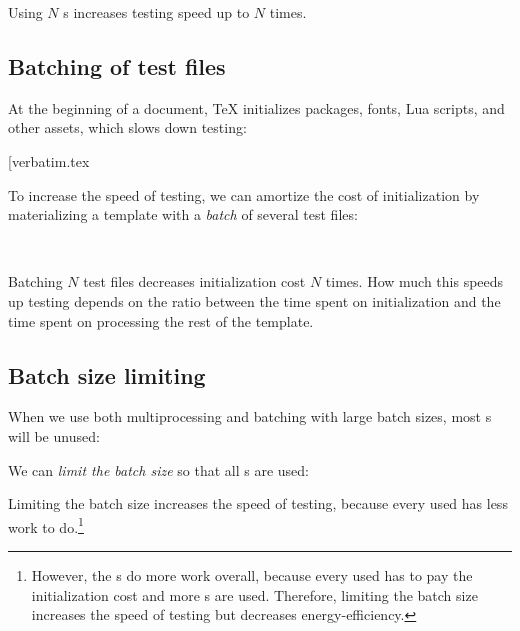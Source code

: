 \documentclass[final]{ltugboat}
\begin{document}
\smallskip
\noindent
\begingroup
\centering

\par
\endgroup

\smallskip
\noindent
Using $N$ s increases testing speed up to $N$ times.

\subsection{Batching of test files}
\label{sec:batching-of-test-files}
At the beginning of a document, \TeX{} initializes packages, fonts, Lua scripts, and other assets, which slows down testing:

\smallskip
\noindent
\example*[{verbatim.tex}

\smallskip

To increase the speed of testing, we can amortize the cost of initialization by materializing a template with a \emph{batch} of several test files:

\medskip
\noindent
{} \\

\smallskip
\noindent
Batching $N$ test files decreases initialization cost $N$ times. How much this speeds up testing depends on the ratio between the time spent on initialization and the time spent on processing the rest of the template.

\subsection{Batch size limiting}

When we use both multiprocessing and batching with large batch sizes, most s will be unused:

\smallskip
\noindent
\begingroup
\centering

\par
\endgroup

\smallskip
\noindent
We can \emph{limit the batch size} so that all s are used:

\medskip
\noindent
\begingroup
\centering

\par
\endgroup

\smallskip
\noindent
{}
Limiting the batch size increases the speed of testing, because every used  has less work to do.\footnote{However, the s do more work overall, because every used  has to pay the initialization cost and more s are used. Therefore, limiting the batch size increases the speed of testing but decreases energy-efficiency.}
\end{document}

